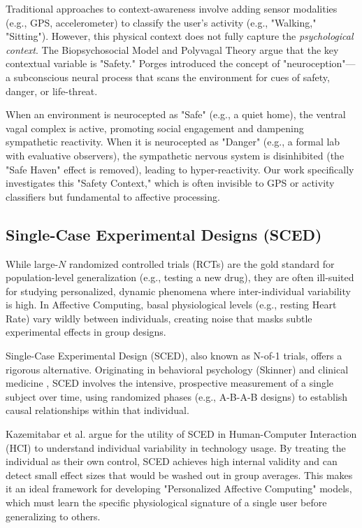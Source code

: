 Traditional approaches to context-awareness involve adding sensor modalities (e.g., GPS, accelerometer) to classify the user's activity (e.g., "Walking," "Sitting"). However, this physical context does not fully capture the \textit{psychological context}. The Biopsychosocial Model \cite{biopsychosocial_model} and Polyvagal Theory \cite{polyvagal} argue that the key contextual variable is "Safety." Porges \cite{porges_safe_haven} introduced the concept of "neuroception"—a subconscious neural process that scans the environment for cues of safety, danger, or life-threat.

When an environment is neurocepted as "Safe" (e.g., a quiet home), the ventral vagal complex is active, promoting social engagement and dampening sympathetic reactivity. When it is neurocepted as "Danger" (e.g., a formal lab with evaluative observers), the sympathetic nervous system is disinhibited (the "Safe Haven" effect is removed), leading to hyper-reactivity. Our work specifically investigates this "Safety Context," which is often invisible to GPS or activity classifiers but fundamental to affective processing.

\subsection{Single-Case Experimental Designs (SCED)}
While large-$N$ randomized controlled trials (RCTs) are the gold standard for population-level generalization (e.g., testing a new drug), they are often ill-suited for studying personalized, dynamic phenomena where inter-individual variability is high. In Affective Computing, basal physiological levels (e.g., resting Heart Rate) vary wildly between individuals, creating noise that masks subtle experimental effects in group designs.

Single-Case Experimental Design (SCED), also known as N-of-1 trials, offers a rigorous alternative. Originating in behavioral psychology (Skinner) and clinical medicine \cite{barlow_sced}, SCED involves the intensive, prospective measurement of a single subject over time, using randomized phases (e.g., A-B-A-B designs) to establish causal relationships within that individual.

Kazemitabar et al. \cite{kazemitabar_sced_hci} argue for the utility of SCED in Human-Computer Interaction (HCI) to understand individual variability in technology usage. By treating the individual as their own control, SCED achieves high internal validity and can detect small effect sizes that would be washed out in group averages. This makes it an ideal framework for developing "Personalized Affective Computing" models, which must learn the specific physiological signature of a single user before generalizing to others.
